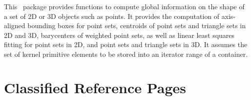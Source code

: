 
\label{ref_chapter_pca}




This \cgal\ package provides functions to compute global information
on the shape of a set of 2D or 3D objects such as points. It provides the computation of axis-aligned bounding boxes for point sets, centroids of point sets and triangle sets in 2D and 3D, barycenters of weighted point sets, as well as linear least squares fitting for point sets in 2D, and point sets and triangle sets in 3D. It assumes the set of kernel primitive elements to be stored into an iterator range of a container.




\section{Classified Reference Pages}


\\
\\
\\
\\

